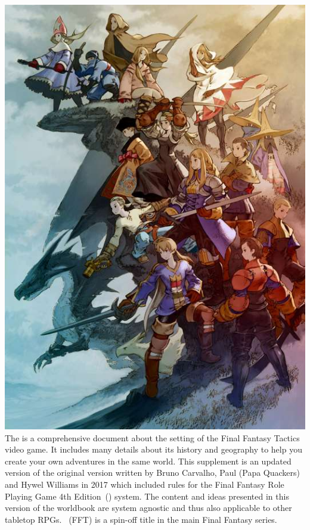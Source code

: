 %
\\\\
%
\includegraphics[width=\columnwidth]{./art/worldbook/everyone.jpg}
%
\ofrow
%
The  is a comprehensive document about the setting of the Final Fantasy Tactics video game.
It includes many details about its history and geography to help you create your own adventures in the same world.
This supplement is an updated version of the original version written by Bruno Carvalho, Paul (Papa Quackers) and Hywel Williams in 2017 which included rules for the Final Fantasy Role Playing Game 4th Edition~() system.
The content and ideas presented in this version of the worldbook are system agnostic and thus also applicable to other tabletop RPGs.
%
\ofpar
%
~(FFT) is a spin-off title in the main Final Fantasy series. 
